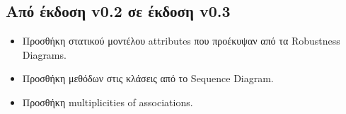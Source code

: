\documentclass[12pt,a4paper]{article}
\begin{document}
\subsection{Από έκδοση v0.2 σε έκδοση v0.3}
\begin{itemize}
    \item Προσθήκη στατικού μοντέλου attributes που προέκυψαν από τα Robustness Diagrams.
    \item Προσθήκη μεθόδων στις κλάσεις από το Sequence Diagram.
    \item Προσθήκη multiplicities of associations.
\end{itemize}
\end{document}
